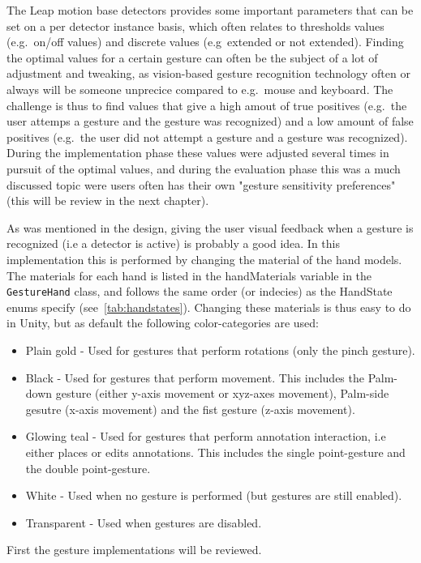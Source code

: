 The Leap motion base detectors provides some important parameters that can be set on a per detector instance basis, which often relates to thresholds values (e.g.~on/off values) and discrete
values (e.g~extended or not extended). Finding the optimal values for a certain gesture can often be the subject of a lot of adjustment and tweaking, as vision-based gesture recognition
technology often or always will be someone unprecice compared to e.g.~mouse and keyboard. The challenge is thus to find values that give a high amout of true positives (e.g.~the user attemps a gesture
and the gesture was recognized) and a low amount of false positives (e.g.~the user did not attempt a gesture and a gesture was recognized). 
During the implementation phase these values were adjusted several times in pursuit of the optimal values, and during the evaluation phase this was a much discussed topic were users often 
has their own "gesture sensitivity preferences" (this will be review in the next chapter). 

As was mentioned in the design, giving the user visual feedback when a gesture is recognized (i.e a detector is active) is probably a good idea.
In this implementation this is performed by changing the material of the hand models. The materials for each hand is listed in the handMaterials variable in the
\texttt{GestureHand} class, and follows the same order (or indecies) as the HandState enums specify (see~\vref{tab:handstates}). 
Changing these materials is thus easy to do in Unity, but as default the following color-categories are used:
\begin{itemize}
\item Plain gold   - Used for gestures that perform rotations (only the pinch gesture).
\item Black 	   - Used for gestures that perform movement. This includes the Palm-down gesture (either y-axis movement or xyz-axes movement), 
			  		 Palm-side gesutre (x-axis movement) and the fist gesture (z-axis movement).
\item Glowing teal - Used for gestures that perform annotation interaction, i.e either places or edits annotations.
					 This includes the single point-gesture and the double point-gesture.
\item White 	   - Used when no gesture is performed (but gestures are still enabled).
\item Transparent  - Used when gestures are disabled.					
\end{itemize}

First the gesture implementations will be reviewed. 


